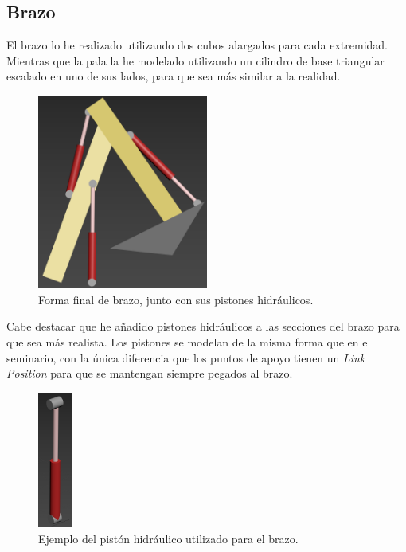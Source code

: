 \subsection{Brazo}

El brazo lo he realizado utilizando dos cubos alargados para cada extremidad. Mientras que la pala la he modelado utilizando un cilindro de base triangular escalado en uno de sus lados, para que sea más similar a la realidad.

\begin{figure}[H]
   \centering
   \includegraphics[width=0.5\textwidth]{imagenes/brazo.png}
   \caption{Forma final de brazo, junto con sus pistones hidráulicos.}
\end{figure}

Cabe destacar que he añadido pistones hidráulicos a las secciones del brazo para que sea más realista. Los pistones se modelan de la misma forma que en el seminario, con la única diferencia que los puntos de apoyo tienen un \textit{Link Position} para que se mantengan siempre pegados al brazo.

\begin{figure}[H]
    \centering
    \includegraphics[width=0.1\textwidth]{imagenes/piston.png}
    \caption{Ejemplo del pistón hidráulico utilizado para el brazo.}
 \end{figure}